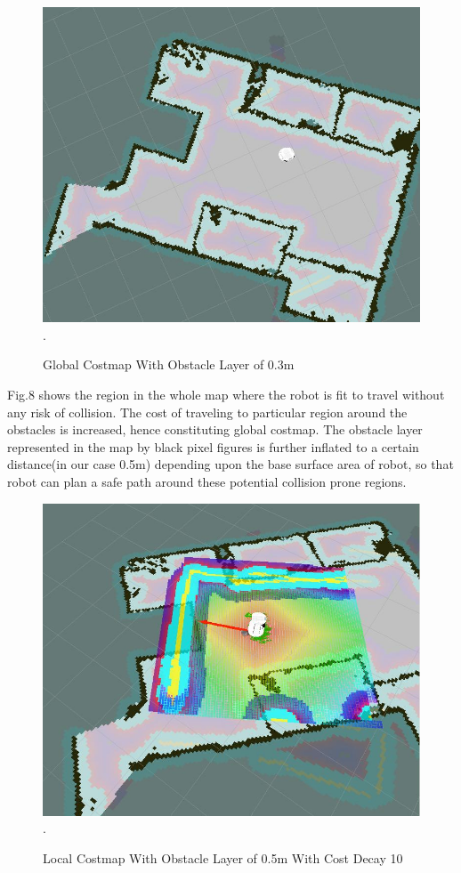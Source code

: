 \documentclass[journal,twoside]{IEEEtran}
\begin{document}
\begin{figure}[h!]
\centering
\includegraphics[scale=.32]{8.jpg}
\DeclareGraphicsExtensions.
\caption{Global Costmap With Obstacle Layer of 0.3m}
\end{figure}
\par\noindent Fig.8 shows the region in the whole map where the robot is fit to travel without any risk of collision. The cost of traveling to particular region around the obstacles is increased, hence constituting global costmap. The obstacle layer represented in the map by black pixel figures is further inflated to a certain distance(in our case 0.5m) depending upon the base surface area of robot, so that robot can plan a safe path around these potential collision prone regions. 
\begin{figure}[h]
\centering
\includegraphics[scale=.27]{9.jpg}
\DeclareGraphicsExtensions.
\caption{Local Costmap With Obstacle Layer of 0.5m With Cost Decay 10}
\end{figure}
\end{document}
